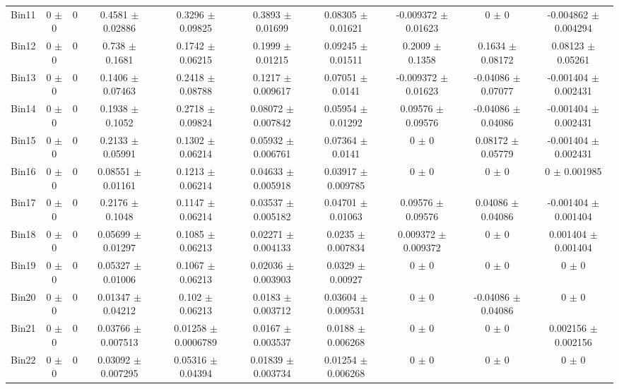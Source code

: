 \begin{tabular}{@{\extracolsep{4pt}}lccccccccc@{}}
     Bin11 & 0 $\pm$ 0 & 0 & 0.4581 $\pm$ 0.02886 & 0.3296 $\pm$ 0.09825 & 0.3893 $\pm$ 0.01699 & 0.08305 $\pm$ 0.01621 & -0.009372 $\pm$ 0.01623 & 0 $\pm$ 0 & -0.004862 $\pm$ 0.004294 \\ 
     Bin12 & 0 $\pm$ 0 & 0 & 0.738 $\pm$ 0.1681 & 0.1742 $\pm$ 0.06215 & 0.1999 $\pm$ 0.01215 & 0.09245 $\pm$ 0.01511 & 0.2009 $\pm$ 0.1358 & 0.1634 $\pm$ 0.08172 & 0.08123 $\pm$ 0.05261 \\ 
     Bin13 & 0 $\pm$ 0 & 0 & 0.1406 $\pm$ 0.07463 & 0.2418 $\pm$ 0.08788 & 0.1217 $\pm$ 0.009617 & 0.07051 $\pm$ 0.0141 & -0.009372 $\pm$ 0.01623 & -0.04086 $\pm$ 0.07077 & -0.001404 $\pm$ 0.002431 \\ 
     Bin14 & 0 $\pm$ 0 & 0 & 0.1938 $\pm$ 0.1052 & 0.2718 $\pm$ 0.09824 & 0.08072 $\pm$ 0.007842 & 0.05954 $\pm$ 0.01292 & 0.09576 $\pm$ 0.09576 & -0.04086 $\pm$ 0.04086 & -0.001404 $\pm$ 0.002431 \\ 
     Bin15 & 0 $\pm$ 0 & 0 & 0.2133 $\pm$ 0.05991 & 0.1302 $\pm$ 0.06214 & 0.05932 $\pm$ 0.006761 & 0.07364 $\pm$ 0.0141 & 0 $\pm$ 0 & 0.08172 $\pm$ 0.05779 & -0.001404 $\pm$ 0.002431 \\ 
     Bin16 & 0 $\pm$ 0 & 0 & 0.08551 $\pm$ 0.01161 & 0.1213 $\pm$ 0.06214 & 0.04633 $\pm$ 0.005918 & 0.03917 $\pm$ 0.009785 & 0 $\pm$ 0 & 0 $\pm$ 0 & 0 $\pm$ 0.001985 \\ 
     Bin17 & 0 $\pm$ 0 & 0 & 0.2176 $\pm$ 0.1048 & 0.1147 $\pm$ 0.06214 & 0.03537 $\pm$ 0.005182 & 0.04701 $\pm$ 0.01063 & 0.09576 $\pm$ 0.09576 & 0.04086 $\pm$ 0.04086 & -0.001404 $\pm$ 0.001404 \\ 
     Bin18 & 0 $\pm$ 0 & 0 & 0.05699 $\pm$ 0.01297 & 0.1085 $\pm$ 0.06213 & 0.02271 $\pm$ 0.004133 & 0.0235 $\pm$ 0.007834 & 0.009372 $\pm$ 0.009372 & 0 $\pm$ 0 & 0.001404 $\pm$ 0.001404 \\ 
     Bin19 & 0 $\pm$ 0 & 0 & 0.05327 $\pm$ 0.01006 & 0.1067 $\pm$ 0.06213 & 0.02036 $\pm$ 0.003903 & 0.0329 $\pm$ 0.00927 & 0 $\pm$ 0 & 0 $\pm$ 0 & 0 $\pm$ 0 \\ 
     Bin20 & 0 $\pm$ 0 & 0 & 0.01347 $\pm$ 0.04212 & 0.102 $\pm$ 0.06213 & 0.0183 $\pm$ 0.003712 & 0.03604 $\pm$ 0.009531 & 0 $\pm$ 0 & -0.04086 $\pm$ 0.04086 & 0 $\pm$ 0 \\ 
     Bin21 & 0 $\pm$ 0 & 0 & 0.03766 $\pm$ 0.007513 & 0.01258 $\pm$ 0.0006789 & 0.0167 $\pm$ 0.003537 & 0.0188 $\pm$ 0.006268 & 0 $\pm$ 0 & 0 $\pm$ 0 & 0.002156 $\pm$ 0.002156 \\ 
     Bin22 & 0 $\pm$ 0 & 0 & 0.03092 $\pm$ 0.007295 & 0.05316 $\pm$ 0.04394 & 0.01839 $\pm$ 0.003734 & 0.01254 $\pm$ 0.006268 & 0 $\pm$ 0 & 0 $\pm$ 0 & 0 $\pm$ 0 \\ 

\end{tabular}
